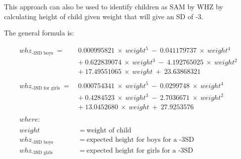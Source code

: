 \documentclass[12pt,a4paper]{article}
\theoremstyle{definition}
\theoremstyle{definition}
\theoremstyle{definition}
\theoremstyle{remark}
\begin{document}
This approach can also be used to identify children as SAM by WHZ by
calculating height of child given weight that will give an SD of -3.

The general formula is:

\[\begin{aligned}
whz_\text{-3SD boys} ~ = ~ & 0.000995821 ~ \times ~ weight ^ 5 ~ - ~ 0.041179737 ~ \times ~ weight ^ 4 \\
& + ~ 0.622839074 ~ \times ~ weight ^ 3 ~ - ~ 4.192765025 ~ \times ~ weight ^ 2 \\
& + ~ 17.49551065 ~ \times ~ weight ~ + ~ 23.63868321 \\
\\
whz_\text{-3SD for girls} ~ = ~ &  0.000754341 ~ \times ~ weight ^ 5 ~ - ~ 0.0299748 ~ \times ~ weight ^ 4 \\
& + ~ 0.4284523 ~ \times ~ weight ^ 3 ~ - ~ 2.7036671 ~ \times ~ weight ^ 2 \\
& + ~ 13.0452680 ~ \times ~ weight ~ + ~ 27.9253576 \\
\\
where: & \\
\\
weight & ~ = ~ \text{weight of child} \\
whz_\text{-3SD boys} & ~ = ~ \text{expected height for boys for a -3SD} \\
whz_\text{-3SD girls} & ~ = ~ \text{expected height for girls for a -3SD}
\end{aligned}\]
\end{document}
